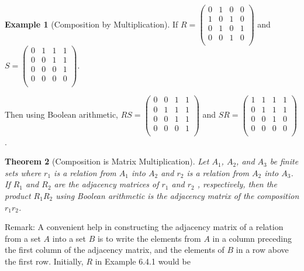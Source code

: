 \documentclass[10pt,]{book}
\theoremstyle{plain}
\newtheorem{theorem}{Theorem}[section]
\theoremstyle{definition}
\theoremstyle{definition}
\theoremstyle{definition}
\newtheorem{example}[theorem]{Example}
\theoremstyle{definition}
\begin{document}
\begin{example}[Composition by Multiplication]\label{ex-composition-matrices}
If  \(R=\left(
\begin{array}{cccc}
 0 & 1 & 0 & 0 \\
 1 & 0 & 1 & 0 \\
 0 & 1 & 0 & 1 \\
 0 & 0 & 1 & 0 \\
\end{array}
\right)\)  and  \(S=\left(
\begin{array}{cccc}
 0 & 1 & 1 & 1 \\
 0 & 0 & 1 & 1 \\
 0 & 0 & 0 & 1 \\
 0 & 0 & 0 & 0 \\
\end{array}
\right)\).

Then using Boolean arithmetic, \(R S =\left(
\begin{array}{cccc}
 0 & 0 & 1 & 1 \\
 0 & 1 & 1 & 1 \\
 0 & 0 & 1 & 1 \\
 0 & 0 & 0 & 1 \\
\end{array}
\right)\)  and \(S R=\left(
\begin{array}{cccc}
 1 & 1 & 1 & 1 \\
 0 & 1 & 1 & 1 \\
 0 & 0 & 1 & 0 \\
 0 & 0 & 0 & 0 \\
\end{array}
\right)\).
%
\end{example}
\begin{theorem}[Composition is Matrix Multiplication]\label{theorem-composition-is-multiplication}
Let \(A_1\), 
\(A_2\), and \(A_3\) be finite sets where \(r_1\) is a relation from \(A_1\) into \(A_2\) and \(r_2\)
is a relation from \(A_2\) into \(A_3\). If \(R_1\) and \(R_2\) are the adjacency matrices of \(r_1\) and \(r_2\) , respectively, then the product
\(R_1R_2\) using Boolean arithmetic is the adjacency matrix of the composition \(r_1r_2\).%
\end{theorem}
\par
Remark: A convenient help in constructing the adjacency matrix of a relation from a set \(A\) into a set \(B\) is to write the elements from \(A\) in a column preceding the first column of the adjacency matrix, and the elements of \(B\) in a row above the first row. Initially, \(R\) in Example 6.4.1 would be
\end{document}
